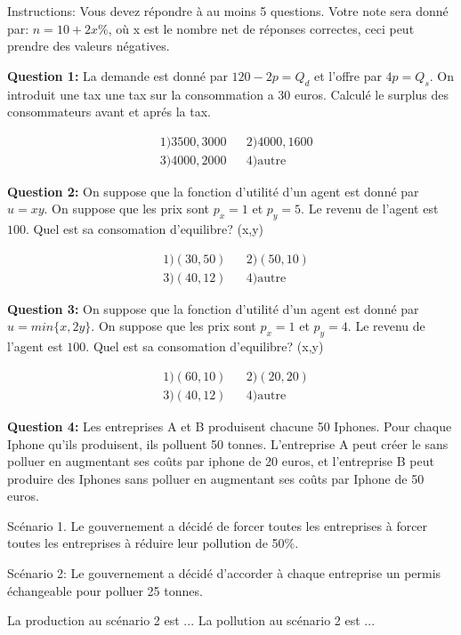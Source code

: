 \documentclass[11pt]{article}
\numberwithin{equation}{section}
\begin{document}
Instructions: 
Vous devez répondre à au moins 5 questions. Votre note sera donné par: $n = 10 + 2 x \% $, où x est le nombre net de réponses correctes, ceci peut prendre des valeurs négatives.

\textbf{Question 1:} La demande est donné par $ 120-2 p = Q_d$ et l'offre par $4p = Q_s$. On introduit une tax une tax sur la consommation a $30$ euros. Calculé le surplus des consommateurs avant et aprés la tax. 

\begin{align*}
&1) 3500,3000 && 2) 4000, 1600 \\
&3) 4000,2000 && 4) \text{autre}
\end{align*}


\textbf{Question 2:}
On suppose que la fonction d'utilité d'un agent est donné par $u=xy$. On suppose que les prix sont $p_x=1$ et $p_y=5$. Le revenu de l'agent est $100$. Quel est sa consomation d'equilibre? (x,y)

\begin{align*}
&1) (30,50) && 2) (50,10) \\
&3) (40,12) && 4) \text{autre}
\end{align*}

\textbf{Question 3:}
On suppose que la fonction d'utilité d'un agent est donné par $u=min\{x,2y\}$. On suppose que les prix sont $p_x=1$ et $p_y=4$. Le revenu de l'agent est $100$. Quel est sa consomation d'equilibre? (x,y)

\begin{align*}
&1) (60,10) && 2) (20,20) \\
&3) (40,12) && 4) \text{autre}
\end{align*}

\newpage

\textbf{Question 4:}
Les entreprises A et B produisent chacune 50 Iphones. Pour chaque Iphone qu'ils produisent, ils polluent 50 tonnes. L'entreprise A peut créer le sans polluer en augmentant ses coûts par iphone de 20 euros, et l'entreprise B peut produire des Iphones sans polluer en augmentant ses coûts par Iphone de 50 euros.

Scénario 1. Le gouvernement a décidé de forcer toutes les entreprises à forcer toutes les entreprises à réduire leur pollution de 50\%.

Scénario 2: Le gouvernement a décidé d'accorder à chaque entreprise un permis échangeable pour polluer 25 tonnes.

La production au scénario 2 est ...
La pollution au scénario 2 est ...
\end{document}
